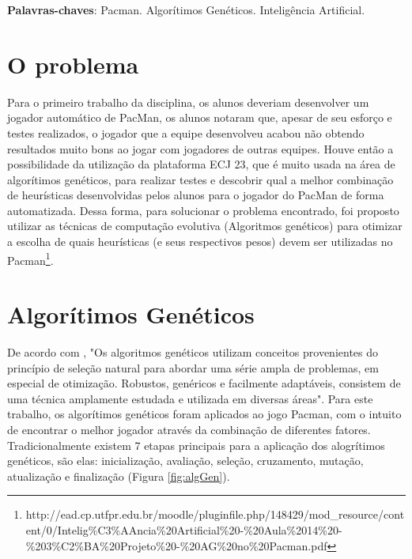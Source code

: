 \documentclass[12pt, a4paper, english, brazil]{abntex2}
\begin{document}
\frenchspacing 
\imprimircapa
\imprimirfolhaderosto*

\begin{resumo}

 \vspace{\onelineskip}
 \noindent
 \textbf{Palavras-chaves}: Pacman. Algorítimos Genéticos. Inteligência Artificial.
\end{resumo}

\tableofcontents*
\textual

\chapter{O problema}
Para o primeiro trabalho da disciplina, os alunos deveriam desenvolver um jogador automático de PacMan, os alunos notaram que, apesar de seu esforço e testes realizados, o jogador que a equipe desenvolveu acabou não obtendo resultados muito bons ao jogar com jogadores de outras equipes.
Houve então a possibilidade da utilização da plataforma ECJ 23, que é muito usada na área de algorítimos genéticos, para realizar testes e descobrir qual a melhor combinação de heurísticas desenvolvidas pelos alunos para o jogador do PacMan de forma automatizada. Dessa forma, para solucionar o problema encontrado, foi proposto utilizar as técnicas de computação evolutiva (Algoritmos genéticos) para otimizar a escolha de quais heurísticas (e seus respectivos pesos) devem ser utilizadas no Pacman\footnote{http://ead.cp.utfpr.edu.br/moodle/pluginfile.php/148429/mod\_resource/content/0/Intelig\%C3\%AAncia\%20Artificial\%20-\%20Aula\%2014\%20-\%203\%C2\%BA\%20Projeto\%20-\%20AG\%20no\%20Pacman.pdf}.


\chapter{Algorítimos Genéticos}
De acordo com \cite{algGen}, "Os algoritmos genéticos utilizam conceitos provenientes do princípio de seleção
natural para abordar uma série ampla de problemas, em especial de otimização.
Robustos, genéricos e facilmente adaptáveis, consistem de uma técnica amplamente
estudada e utilizada em diversas áreas".
Para este trabalho, os algorítimos genéticos foram aplicados ao jogo Pacman, com o intuito de encontrar o melhor jogador através da combinação de diferentes fatores.
Tradicionalmente existem 7 etapas principais para a aplicação dos alogrítimos genéticos, são elas: inicialização, avaliação, seleção, cruzamento, mutação, atualização e finalização (Figura \ref{fig:algGen}).
\end{document}
